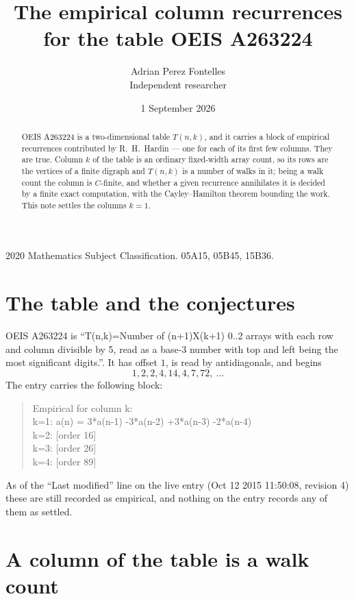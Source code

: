 \documentclass[11pt,a4paper]{article}
\title{The empirical column recurrences for the table OEIS A263224}
\author{Adrian Perez Fontelles\\ \small Independent researcher}
\date{1 September 2026}
\theoremstyle{plain}
\theoremstyle{definition}
\begin{document}
\maketitle

\begin{abstract}
OEIS A263224 is a two-dimensional table $T(n,k)$, and it carries a block of empirical
recurrences contributed by R.~H.~Hardin --- one for each of its first few columns. They are
true. Column $k$ of the table is an ordinary fixed-width array count, so its rows are the
vertices of a finite digraph and $T(n,k)$ is a number of walks in it; being a walk count the
column is $C$-finite, and whether a given recurrence annihilates it is decided by a finite
exact computation, with the Cayley--Hamilton theorem bounding the work. This note settles the columns $k=1$.
\end{abstract}

\noindent\small 2020 Mathematics Subject Classification. 05A15, 05B45, 15B36.\normalsize

\section{The table and the conjectures}

OEIS A263224 is ``T(n,k)=Number of (n+1)X(k+1) 0..2 arrays with each row and column divisible by 5, read as a base-3 number with top and left being the most significant digits.''. It has offset $1$, is
read by antidiagonals, and begins
\[
1, 2, 2, 4, 14, 4, 7, 72,\ \dots
\]
The entry carries the following block:
\begin{quote}\small
Empirical for column k:\\
k=1: a(n) = 3*a(n-1) -3*a(n-2) +3*a(n-3) -2*a(n-4)\\
k=2: [order 16]\\
k=3: [order 26]\\
k=4: [order 89]\\
\end{quote}
As of the ``Last modified'' line on the live entry (Oct 12 2015 11:50:08, revision 4) these are still
recorded as empirical, and nothing on the entry records any of them as settled.

\section{A column of the table is a walk count}
\end{document}
